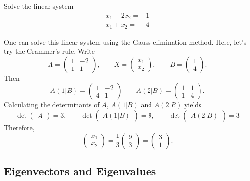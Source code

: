 \begin{example}
  Solve the linear system
  \[
    \begin{aligned}
    x_1-2x_2 = &1\\
    x_1+x_2 = &4  
    \end{aligned}
  \]
\end{example}
\begin{solution}
  One can solve this linear system using the Gauss elimination method. Here, let's try the Crammer's rule.
  Write
  \[
    A= \begin{pmatrix}
    1 & -2\\
    1 & 1
  \end{pmatrix}, \qquad X=\begin{pmatrix}
    x_1\\x_2
  \end{pmatrix}, \qquad B=\begin{pmatrix}
    1\\4
  \end{pmatrix}.\]
  Then
  \[
    A(1|B)=\begin{pmatrix}
    1 & -2\\
    4 & 1
  \end{pmatrix}\qquad A(2|B)=\begin{pmatrix}
    1 & 1\\
    1 & 4
  \end{pmatrix}.
  \]
  Calculating the determinants of $A$, $A(1|B)$ and $A(2|B)$ yields
  \[
    \det\begin{pmatrix}
    A
  \end{pmatrix}=3, \qquad
  \det\begin{pmatrix}
    A(1|B)
  \end{pmatrix}=9,\qquad
  \det\begin{pmatrix}
    A(2|B)
  \end{pmatrix}=3
  \]
  Therefore,
  \[
  \begin{pmatrix}
    x_1\\ x_2
  \end{pmatrix}  = \frac 13
  \begin{pmatrix}
    9\\ 3
  \end{pmatrix} =
  \begin{pmatrix}
    3 \\ 1
  \end{pmatrix}.
  \]
\end{solution}

\subsection*{Eigenvectors and Eigenvalues}

